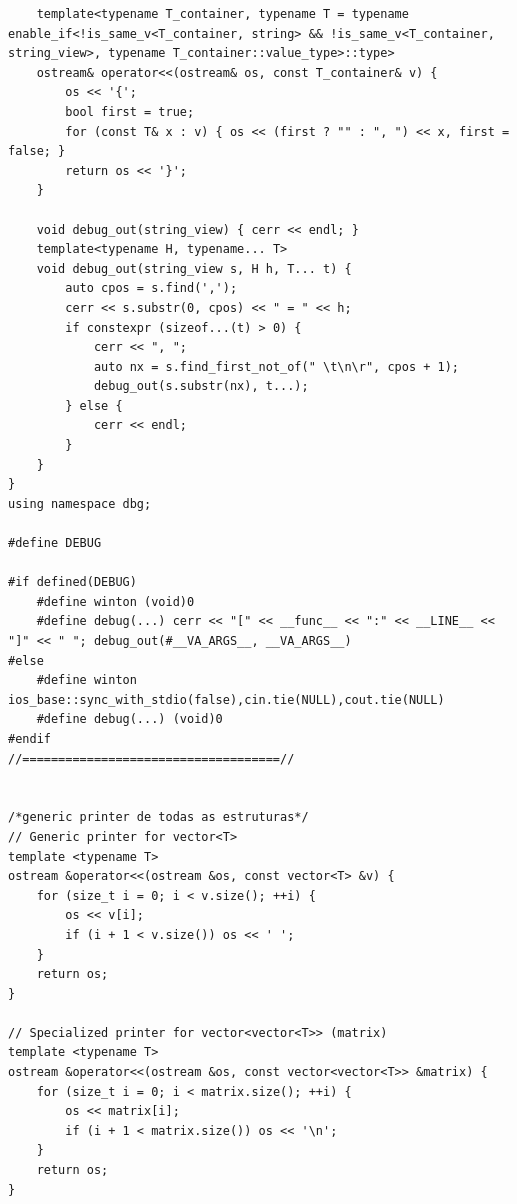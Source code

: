 \documentclass[11pt, a4paper, twoside]{article}
\begin{document}
{\begin{lstlisting}
    template<typename T_container, typename T = typename enable_if<!is_same_v<T_container, string> && !is_same_v<T_container, string_view>, typename T_container::value_type>::type>
    ostream& operator<<(ostream& os, const T_container& v) {
        os << '{';
        bool first = true;
        for (const T& x : v) { os << (first ? "" : ", ") << x, first = false; }
        return os << '}';
    }

    void debug_out(string_view) { cerr << endl; }
    template<typename H, typename... T>
    void debug_out(string_view s, H h, T... t) {
        auto cpos = s.find(',');
        cerr << s.substr(0, cpos) << " = " << h;
        if constexpr (sizeof...(t) > 0) {
            cerr << ", ";
            auto nx = s.find_first_not_of(" \t\n\r", cpos + 1);
            debug_out(s.substr(nx), t...);
        } else {
            cerr << endl;
        }
    }
} 
using namespace dbg;

#define DEBUG

#if defined(DEBUG)
    #define winton (void)0
    #define debug(...) cerr << "[" << __func__ << ":" << __LINE__ << "]" << " "; debug_out(#__VA_ARGS__, __VA_ARGS__)
#else
    #define winton ios_base::sync_with_stdio(false),cin.tie(NULL),cout.tie(NULL)
    #define debug(...) (void)0
#endif
//====================================//


/*generic printer de todas as estruturas*/
// Generic printer for vector<T>
template <typename T>
ostream &operator<<(ostream &os, const vector<T> &v) {
    for (size_t i = 0; i < v.size(); ++i) {
        os << v[i];
        if (i + 1 < v.size()) os << ' ';
    }
    return os;
}

// Specialized printer for vector<vector<T>> (matrix)
template <typename T>
ostream &operator<<(ostream &os, const vector<vector<T>> &matrix) {
    for (size_t i = 0; i < matrix.size(); ++i) {
        os << matrix[i];
        if (i + 1 < matrix.size()) os << '\n';
    }
    return os;
}



\end{lstlisting}}
\end{document}
